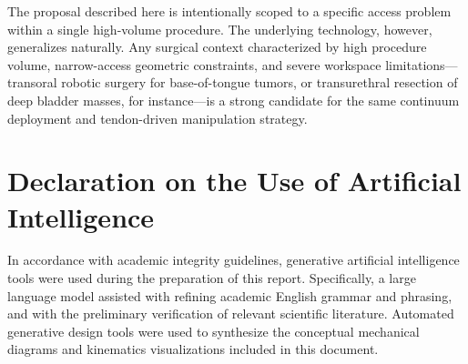 \documentclass{article}
\begin{document}
The proposal described here is intentionally scoped to a specific access problem within a single high-volume procedure. The underlying technology, however, generalizes naturally. Any surgical context characterized by high procedure volume, narrow-access geometric constraints, and severe workspace limitations---transoral robotic surgery for base-of-tongue tumors, or transurethral resection of deep bladder masses, for instance---is a strong candidate for the same continuum deployment and tendon-driven manipulation strategy.

\section*{Declaration on the Use of Artificial Intelligence}

In accordance with academic integrity guidelines, generative artificial intelligence tools were used during the preparation of this report. Specifically, a large language model assisted with refining academic English grammar and phrasing, and with the preliminary verification of relevant scientific literature. Automated generative design tools were used to synthesize the conceptual mechanical diagrams and kinematics visualizations included in this document.



\end{document}
